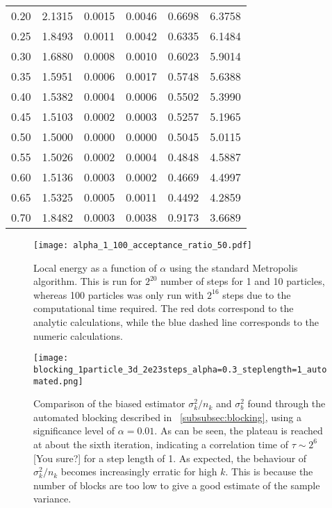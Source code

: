 \documentclass[
    a4paper, aps, twocolumn, floatfix, superscriptaddress,
    nofootinbib]{revtex4-1}
\begin{document}
\begin{table}[h!]
\begin{ruledtabular}
\begin{tabular}{cccccc}
0.20     & 2.1315 & 0.0015   & 0.0046     & 0.6698      & 6.3758    \\
0.25     & 1.8493 & 0.0011   & 0.0042     & 0.6335      & 6.1484    \\
0.30     & 1.6880 & 0.0008   & 0.0010     & 0.6023      & 5.9014    \\
0.35     & 1.5951 & 0.0006   & 0.0017     & 0.5748      & 5.6388    \\
0.40     &  1.5382 & 0.0004   & 0.0006     & 0.5502      & 5.3990    \\
0.45     & 1.5103 & 0.0002   & 0.0003     & 0.5257      & 5.1965    \\
0.50     &  1.5000 & 0.0000   & 0.0000     & 0.5045      & 5.0115    \\
0.55     &  1.5026 & 0.0002   & 0.0004     & 0.4848      & 4.5887    \\
0.60     & 1.5136 & 0.0003   & 0.0002     & 0.4669      & 4.4997    \\
0.65     &  1.5325 & 0.0005   & 0.0011     & 0.4492      & 4.2859   \\
0.70     & 1.8482 & 0.0003   & 0.0038     & 0.9173      & 3.6689   \\
\end{tabular}
\end{ruledtabular}
\end{table}

\begin{figure}[h!]
    \centering
    \texttt{[image: alpha\_1\_100\_acceptance\_ratio\_50.pdf]}
    \caption{Local energy as a function of $\alpha$ using the standard Metropolis algorithm. This is run for $2^{20}$ number of steps for 1 and 10 particles, whereas 100 particles was only run with $2^{16}$ steps due to the computational time required. The red dots correspond to the analytic calculations, while the blue dashed line corresponds to the numeric calculations.}
    \label{fig:brute_force_spherical_localE}
\end{figure}

\begin{figure}[H]
    \centering
    \texttt{[image: blocking\_1particle\_3d\_2e23steps\_alpha=0.3\_steplength=1\_automated.png]}
    \caption{Comparison of the biased estimator $\sigma_k^2/n_k$ and $\sigma_b^2$ found through the automated blocking described in ~\ref{subsubsec:blocking}, using a significance level of $\alpha = 0.01$. As can be seen, the plateau is reached at about the sixth iteration, indicating a correlation time of $\tau \sim 2^6$ [You sure?] for a step length of 1. As expected, the behaviour of $\sigma_k^2/n_k$ becomes increasingly erratic for high $k$. This is because the number of blocks are too low to give a good estimate of the sample variance.}
    \label{fig:blocking_behaviour}
\end{figure}
\end{document}
